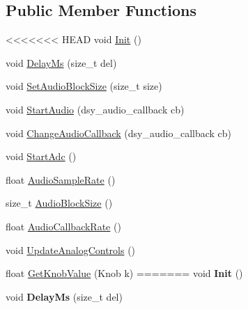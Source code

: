 \begin{DoxyCompactItemize}
\subsection*{Public Member Functions}
\begin{DoxyCompactItemize}
\item 
<<<<<<< HEAD
void \hyperlink{classdaisy_1_1_daisy_petal_aaf7fbbfc6455612354a92382f5b499e7}{Init} ()
\item 
void \hyperlink{classdaisy_1_1_daisy_petal_a927afd75574f8fdd509e23a38c176ed9}{Delay\+Ms} (size\+\_\+t del)
\item 
void \hyperlink{classdaisy_1_1_daisy_petal_a2356b5fdb0f87f28920c96828b2c0c93}{Set\+Audio\+Block\+Size} (size\+\_\+t size)
\item 
void \hyperlink{classdaisy_1_1_daisy_petal_abeccbd23f29072e86da1ffc6267bb87d}{Start\+Audio} (dsy\+\_\+audio\+\_\+callback cb)
\item 
void \hyperlink{classdaisy_1_1_daisy_petal_ac354573a75d3d2e105c635c0b43b3e7d}{Change\+Audio\+Callback} (dsy\+\_\+audio\+\_\+callback cb)
\item 
void \hyperlink{classdaisy_1_1_daisy_petal_aa622a3f66ecb66b1980afd8ed223a60b}{Start\+Adc} ()
\item 
float \hyperlink{classdaisy_1_1_daisy_petal_afa64f617714cd0c248aa4a5f348280ca}{Audio\+Sample\+Rate} ()
\item 
size\+\_\+t \hyperlink{classdaisy_1_1_daisy_petal_ae6d3022e233d25829f470474ede28f99}{Audio\+Block\+Size} ()
\item 
float \hyperlink{classdaisy_1_1_daisy_petal_a95096d84d6d978bfb72b3ec9c791af76}{Audio\+Callback\+Rate} ()
\item 
void \hyperlink{classdaisy_1_1_daisy_petal_ac79b389c66164768a964725189deb12f}{Update\+Analog\+Controls} ()
\item 
float \hyperlink{classdaisy_1_1_daisy_petal_a1e0156fca684721f0ae445b8e4c2ebd7}{Get\+Knob\+Value} (Knob k)
=======
\mbox{\label{classdaisy_1_1_daisy_petal_af19c892692804dabacc8433aa04edc07}} 
void {\bfseries Init} ()
\item 
\mbox{\label{classdaisy_1_1_daisy_petal_a2ae6169b1cffb8d43ee754096abe1f3e}} 
void {\bfseries Delay\+Ms} (size\+\_\+t del)
\item 
\mbox{\label{classdaisy_1_1_daisy_petal_a6d1d129a807e704d9a02f23825db2787}} 

\end{DoxyCompactItemize}
\end{DoxyCompactItemize}
